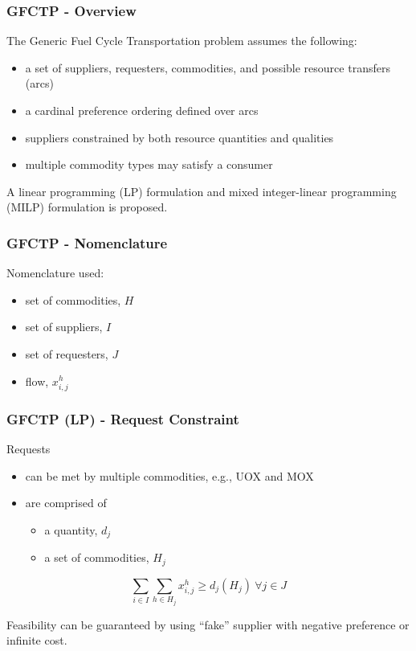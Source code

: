 \begin{frame}[ctb!]
  \frametitle{GFCTP - Overview}
  
  The Generic Fuel Cycle Transportation problem assumes the following:
  \begin{itemize}
    \item a set of suppliers, requesters, commodities, and possible resource
      transfers (arcs)
    \item a cardinal preference ordering defined over arcs
    \item suppliers constrained by both resource quantities and qualities
    \item multiple commodity types may satisfy a consumer
  \end{itemize}

  A linear programming (LP) formulation and mixed integer-linear programming
  (MILP) formulation is proposed.

\end{frame}
  

\begin{frame}[ctb!]
  \frametitle{GFCTP - Nomenclature}

  Nomenclature used:
  \begin{itemize}
    \item set of commodities, $H$
    \item set of suppliers, $I$
    \item set of requesters, $J$
    \item flow, $x^h_{i,j}$
  \end{itemize}

\end{frame}

\begin{frame}[ctb!]
  \frametitle{GFCTP (LP) - Request Constraint}
  
  Requests
  \begin{itemize}
    \item can be met by multiple commodities, e.g., UOX and MOX
    \item are comprised of
      \begin{itemize}
        \item a quantity, $d_j$
        \item a set of commodities, $H_j$
      \end{itemize}
  \end{itemize}

  \begin{equation}
    \sum_{i \in I}\sum_{h \in H_{j}} x_{i,j}^{h} \geq d_{j}(H_{j})  \: \forall j \in J
  \end{equation}
  
  Feasibility can be guaranteed by using ``fake'' supplier with negative
  preference or infinite cost.

\end{frame}

